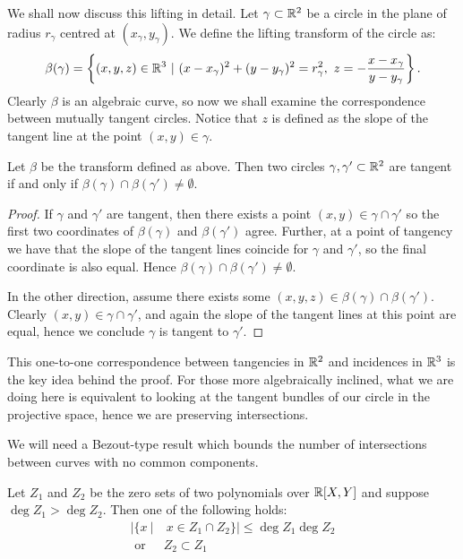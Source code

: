 We shall now discuss this lifting in detail. Let $\gamma \subset \mathbb R^2$ be a circle in the plane of radius $r_{\gamma}$ centred at $(x_\gamma, y_\gamma)$. 
We define the lifting transform of the circle as: \[
    \beta(\gamma) = \left \{ (x,y,z) \in \RR^3 \ | \ (x-x_\gamma)^2 + (y-y_\gamma)^2 = r_\gamma^2, \ z = - \frac{x-x_\gamma}{y-y_\gamma} \right \}.
\]  
Clearly $\beta$ is an algebraic curve, so now we shall examine the correspondence between mutually tangent circles. Notice that $z$ is defined as the slope of the tangent line
at the point $(x,y) \in \gamma$.

\begin{lemma}
    Let $\beta$ be the transform defined as above. 
    Then two circles $\gamma, \gamma' \subset \mathbb R^2$ are tangent if and only if $\beta(\gamma) \cap \beta(\gamma') \neq \emptyset$.
    \label{lem:beta-lift}
\end{lemma}
\begin{proof}
If $\gamma$ and $\gamma'$ are tangent, then there exists a point $(x,y) \in \gamma \cap \gamma'$ so the first two coordinates of $\beta(\gamma)$ and $\beta(\gamma')$ agree. 
Further, at a point of tangency we have that the slope of the tangent lines coincide for $\gamma$ and $\gamma'$, so the final coordinate is also equal. Hence $\beta(\gamma) \cap \beta(\gamma') \neq \emptyset$.

In the other direction, assume there exists some $(x,y,z) \in \beta(\gamma) \cap \beta(\gamma')$. Clearly $(x,y) \in \gamma \cap \gamma'$, and again the slope of the tangent lines at this point are equal, hence we conclude
$\gamma$ is tangent to $\gamma'$.
\end{proof} 
This one-to-one correspondence between tangencies in $\mathbb R^2$ and incidences in $\mathbb R^3$ is the key idea behind the proof. 
For those more algebraically inclined, what we are doing here is equivalent to looking at the tangent bundles of our circle in the projective space, hence we 
are preserving intersections. 

We will need a Bezout-type result which bounds the number of intersections between curves with no common components.
\begin{lemma}
   Let $Z_1$ and $Z_2$ be the zero sets of two polynomials over $\mathbb R[X,Y]$ and suppose $\deg Z_1 > \deg Z_2$. Then one of the following holds:
   \begin{align*}
    |\{ x \ |& \ x \in Z_1 \cap Z_2 \}| \leq \deg Z_1 \deg Z_2 \\
    \text{ or }& Z_2 \subset Z_1
   \end{align*}
    \label{lem:Bezout}
\end{lemma}


